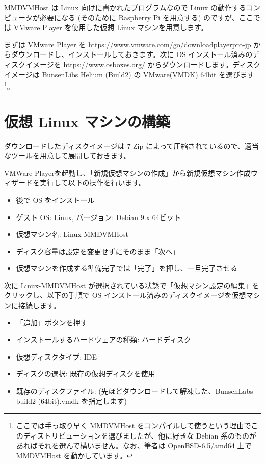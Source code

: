 \documentclass[a4j,oneside]{ujbook}
\begin{document}
MMDVMHost は Linux 向けに書かれたプログラムなので Linux の動作するコンピュータが必要になる (そのために Raspberry Pi を用意する) のですが、ここでは VMware Player を使用した仮想 Linux マシンを用意します。

まずは VMware Player を \url{https://www.vmware.com/go/downloadplayerpro-jp} からダウンロードし、インストールしておきます。次に OS インストール済みのディスクイメージを \url{https://www.osboxes.org/} からダウンロードします。ディスクイメージは BunsenLibs Helium (Build2) の VMware(VMDK) 64bit を選びます\footnote{ここでは手っ取り早く MMDVMHost をコンパイルして使うという理由でこのディストリビューションを選びましたが、他に好きな Debian 系のものがあればそれを選んで構いません。なお、筆者は OpenBSD-6.5/amd64 上で MMDVMHost を動かしています。}。

\section{仮想 Linux マシンの構築}

ダウンロードしたディスクイメージは 7-Zip によって圧縮されているので、適当なツールを用意して展開しておきます。

VMWare Playerを起動し、「新規仮想マシンの作成」から新規仮想マシン作成ウィザードを実行して以下の操作を行います。

\begin{itemize}
 \item 後で OS をインストール
 \item ゲスト OS: Linux, バージョン: Debian 9.x 64ビット
 \item 仮想マシン名: Linux-MMDVMHost
 \item ディスク容量は設定を変更せずにそのまま「次へ」
 \item 仮想マシンを作成する準備完了では「完了」を押し、一旦完了させる
\end{itemize}

次に Linux-MMDVMHost が選択されている状態で「仮想マシン設定の編集」をクリックし、以下の手順で OS インストール済みのディスクイメージを仮想マシンに接続します。

\begin{itemize}
 \item 「追加」ボタンを押す
 \item インストールするハードウェアの種類: ハードディスク
 \item 仮想ディスクタイプ: IDE
 \item ディスクの選択: 既存の仮想ディスクを使用
 \item 既存のディスクファイル: (先ほどダウンロードして解凍した、BunsenLabs build2 (64bit).vmdk を指定します)
\end{itemize}
\end{document}
